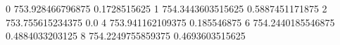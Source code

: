0 753.928466796875 0.1728515625
1 754.3443603515625 0.5887451171875
2 753.755615234375 0.0
4 753.941162109375 0.185546875
6 754.2440185546875 0.4884033203125
8 754.2249755859375 0.4693603515625
